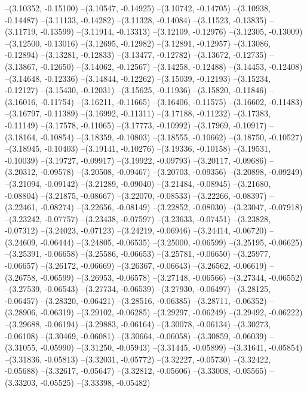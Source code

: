 --(3.10352, -0.15100)
--(3.10547, -0.14925)
--(3.10742, -0.14705)
--(3.10938, -0.14487)
--(3.11133, -0.14282)
--(3.11328, -0.14084)
--(3.11523, -0.13835)
--(3.11719, -0.13599)
--(3.11914, -0.13313)
--(3.12109, -0.12976)
--(3.12305, -0.13009)
--(3.12500, -0.13016)
--(3.12695, -0.12982)
--(3.12891, -0.12957)
--(3.13086, -0.12894)
--(3.13281, -0.12833)
--(3.13477, -0.12782)
--(3.13672, -0.12735)
--(3.13867, -0.12650)
--(3.14062, -0.12567)
--(3.14258, -0.12488)
--(3.14453, -0.12408)
--(3.14648, -0.12336)
--(3.14844, -0.12262)
--(3.15039, -0.12193)
--(3.15234, -0.12127)
--(3.15430, -0.12031)
--(3.15625, -0.11936)
--(3.15820, -0.11846)
--(3.16016, -0.11754)
--(3.16211, -0.11665)
--(3.16406, -0.11575)
--(3.16602, -0.11483)
--(3.16797, -0.11389)
--(3.16992, -0.11311)
--(3.17188, -0.11232)
--(3.17383, -0.11149)
--(3.17578, -0.11065)
--(3.17773, -0.10992)
--(3.17969, -0.10917)
--(3.18164, -0.10854)
--(3.18359, -0.10803)
--(3.18555, -0.10662)
--(3.18750, -0.10527)
--(3.18945, -0.10403)
--(3.19141, -0.10276)
--(3.19336, -0.10158)
--(3.19531, -0.10039)
--(3.19727, -0.09917)
--(3.19922, -0.09793)
--(3.20117, -0.09686)
--(3.20312, -0.09578)
--(3.20508, -0.09467)
--(3.20703, -0.09356)
--(3.20898, -0.09249)
--(3.21094, -0.09142)
--(3.21289, -0.09040)
--(3.21484, -0.08945)
--(3.21680, -0.08804)
--(3.21875, -0.08667)
--(3.22070, -0.08533)
--(3.22266, -0.08397)
--(3.22461, -0.08274)
--(3.22656, -0.08149)
--(3.22852, -0.08030)
--(3.23047, -0.07918)
--(3.23242, -0.07757)
--(3.23438, -0.07597)
--(3.23633, -0.07451)
--(3.23828, -0.07312)
--(3.24023, -0.07123)
--(3.24219, -0.06946)
--(3.24414, -0.06720)
--(3.24609, -0.06444)
--(3.24805, -0.06535)
--(3.25000, -0.06599)
--(3.25195, -0.06625)
--(3.25391, -0.06658)
--(3.25586, -0.06653)
--(3.25781, -0.06650)
--(3.25977, -0.06657)
--(3.26172, -0.06669)
--(3.26367, -0.06643)
--(3.26562, -0.06619)
--(3.26758, -0.06599)
--(3.26953, -0.06578)
--(3.27148, -0.06566)
--(3.27344, -0.06552)
--(3.27539, -0.06543)
--(3.27734, -0.06539)
--(3.27930, -0.06497)
--(3.28125, -0.06457)
--(3.28320, -0.06421)
--(3.28516, -0.06385)
--(3.28711, -0.06352)
--(3.28906, -0.06319)
--(3.29102, -0.06285)
--(3.29297, -0.06249)
--(3.29492, -0.06222)
--(3.29688, -0.06194)
--(3.29883, -0.06164)
--(3.30078, -0.06134)
--(3.30273, -0.06108)
--(3.30469, -0.06081)
--(3.30664, -0.06058)
--(3.30859, -0.06039)
--(3.31055, -0.05990)
--(3.31250, -0.05943)
--(3.31445, -0.05899)
--(3.31641, -0.05854)
--(3.31836, -0.05813)
--(3.32031, -0.05772)
--(3.32227, -0.05730)
--(3.32422, -0.05688)
--(3.32617, -0.05647)
--(3.32812, -0.05606)
--(3.33008, -0.05565)
--(3.33203, -0.05525)
--(3.33398, -0.05482)
